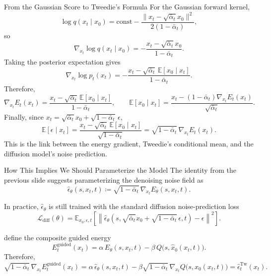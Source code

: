 \documentclass[aspectratio=169,11pt]{beamer}
\begin{document}
 \begin{frame}{From the Gaussian Score to Tweedie's Formula}
 \small
 For the Gaussian forward kernel,
 \[
 \log q(x_t\mid x_0)=\mathrm{const}-\frac{\|x_t-\sqrt{\bar\alpha_t}x_0\|^2}{2(1-\bar\alpha_t)},
 \]
 so
 \[
 \nabla_{x_t}\log q(x_t\mid x_0)
 = -\frac{x_t-\sqrt{\bar\alpha_t}x_0}{1-\bar\alpha_t}.
 \]
 Taking the posterior expectation gives
 \[
 \nabla_{x_t}\log p_t(x_t)
 = -\frac{x_t-\sqrt{\bar\alpha_t}\,\mathbb{E}[x_0\mid x_t]}{1-\bar\alpha_t}.
 \]
 Therefore,
 \[
 \nabla_{x_t}E_t(x_t)
 = \frac{x_t-\sqrt{\bar\alpha_t}\,\mathbb{E}[x_0\mid x_t]}{1-\bar\alpha_t},
 \qquad
 \mathbb{E}[x_0\mid x_t]
 = \frac{x_t-(1-\bar\alpha_t)\nabla_{x_t}E_t(x_t)}{\sqrt{\bar\alpha_t}}.
 \]
 Finally, since $x_t=\sqrt{\bar\alpha_t}x_0+\sqrt{1-\bar\alpha_t}\,\epsilon$,
 \[
 \mathbb{E}[\epsilon\mid x_t]
 = \frac{x_t-\sqrt{\bar\alpha_t}\,\mathbb{E}[x_0\mid x_t]}{\sqrt{1-\bar\alpha_t}}
 = \sqrt{1-\bar\alpha_t}\,\nabla_{x_t}E_t(x_t).
 \]
 This is the link between the energy gradient, Tweedie's conditional mean, and the diffusion model's noise prediction.
 \end{frame}

 \begin{frame}{How This Implies We Should Parameterize the Model}
 \small
 The identity from the previous slide suggests parameterizing the denoising noise field as
 \[
 \hat\epsilon_\theta(s,x_t,t)\coloneqq\sqrt{1-\bar\alpha_t}\,\nabla_{x_t}E_\theta(s,x_t,t).
 \]

 In practice, $\hat\epsilon_\theta$ is still trained with the standard diffusion noise-prediction loss
 \[
 \mathcal{L}_{\mathrm{diff}}(\theta)=\mathbb{E}_{x_0,\epsilon,t}\left[\left\lVert \hat\epsilon_\theta\!\left(s,\sqrt{\bar\alpha_t}x_0+\sqrt{1-\bar\alpha_t}\,\epsilon,t\right)-\epsilon\right\rVert^2\right].
 \]

 define the composite guided energy
 \[
 E_t^{\mathrm{guided}}(x_t)=\alpha\,E_\theta(s,x_t,t)-\beta\,Q\bigl(s,\hat x_0(x_t,t)\bigr).
 \]
 Therefore,
 \[
 \sqrt{1-\bar\alpha_t}\,\nabla_{x_t}E_t^{\mathrm{guided}}(x_t)
 = \alpha\,\hat\epsilon_\theta(s,x_t,t)-\beta\sqrt{1-\bar\alpha_t}\,\nabla_{x_t}Q\bigl(s,\hat x_0(x_t,t)\bigr)
 = \hat\epsilon_t^{\mathrm{Tw}}(x_t).
 \]
 \end{frame}
\end{document}
